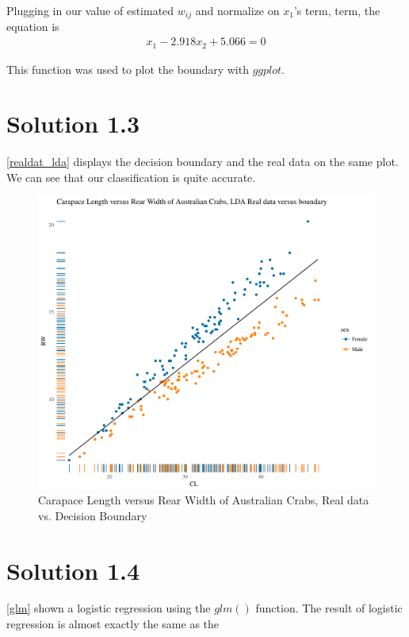 \documentclass[11pt,english]{article}
\begin{document}
Plugging in our value of estimated $w_{ij}$ and normalize on $x_1$'s term,
term, the equation is
\begin{align*}
  x_1 - 2.918x_2 + 5.066 = 0
\end{align*}

This function was used to plot the boundary with $ggplot$.

\section*{Solution 1.3}
\autoref{realdat_lda} displays the decision boundary and the real data on
the same plot. We can see that our classification is quite accurate.

\begin{figure}[H]
  \centering
  \includegraphics[width = 1.13\textwidth]{realdat_lda.pdf}
  \caption{Carapace Length versus Rear Width of Australian Crabs, Real data
  vs. Decision Boundary}
  \label{realdat_lda}
\end{figure}

\section*{Solution 1.4}

\autoref{glm} shown a logistic regression using the $glm()$ function. The
result of logistic regression is almost exactly the same as the 
\end{document}
